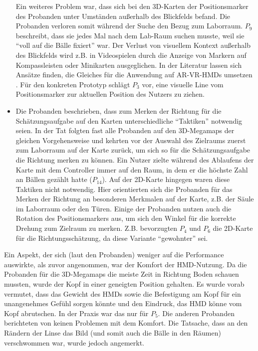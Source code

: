 \begin{itemize}
    Ein weiteres Problem war, dass sich bei den 3D-Karten der Positionsmarker des Probanden unter Umständen außerhalb des Blickfelds befand.
    Die Probanden verloren somit während der Suche den Bezug zum Laborraum.
    $P_9$ beschreibt, dass sie jedes Mal nach dem Lab-Raum suchen musste, weil sie \enquote{voll auf die Bälle fixiert} war.
    Der Verlust von visuellem Kontext außerhalb des Blickfelds wird z.B. in Videospielen durch die Anzeige von Markern auf Kompassleisten oder Minikarten ausgeglichen.
    In der Literatur lassen sich Ansätze finden, die Gleiches für die Anwendung auf AR-VR-HMDs umsetzen \autocites{Lin2017a}{Gruenefeld2017}.
    Für den konkreten Prototyp schlägt $P_3$ vor, eine visuelle Line vom Positionsmarker zur aktuellen Position des Nutzers zu ziehen.
    
    \item
    Die Probanden beschrieben, dass zum Merken der Richtung für die Schätzungsaufgabe auf den Karten unterschiedliche \enquote{Taktiken} notwendig seien.
    In der Tat folgten fast alle Probanden auf den 3D-Megamaps der gleichen Vorgehensweise und kehrten vor der Auswahl des Zielraums zuerst zum Laborraum auf der Karte zurück, um sich so für die Schätzungsaufgabe die Richtung merken zu können.
    Ein Nutzer zielte während des Ablaufens der Karte mit dem Controller immer auf den Raum, in dem er die höchste Zahl an Bällen gezählt hatte ($P_{14}$).
    Auf der 2D-Karte hingegen waren diese Taktiken nicht notwendig.
    Hier orientierten sich die Probanden für das Merken der Richtung an besonderen Merkmalen auf der Karte, z.B. der Säule im Laborraum oder den Türen.
    Einige der Probanden nutzen auch die Rotation des Positionsmarkers aus, um sich den Winkel für die korrekte Drehung zum Zielraum zu merken.
    Z.B. bevorzugten $P_4$ und $P_6$ die 2D-Karte für die Richtungsschätzung, da diese Variante \enquote{gewohnter} sei.
\end{itemize}

Ein Aspekt, der sich (laut den Probanden) weniger auf die Performance auswirkte, als zuvor angenommen, war der Komfort der HMD-Nutzung.
Da die Probanden für die 3D-Megamaps die meiste Zeit in Richtung Boden schauen mussten, wurde der Kopf in einer geneigten Position gehalten.
Es wurde vorab vermutet, dass das Gewicht des HMDs sowie die Befestigung am Kopf für ein unangenehmes Gefühl sorgen könnte und den Eindruck, das HMD könne vom Kopf abrutschen.
In der Praxis war das nur für $P_5$.
Die anderen Probanden berichteten von keinen Problemen mit dem Komfort.
Die Tatsache, dass an den Rändern der Linse das Bild (und somit auch die Bälle in den Räumen) verschwommen war, wurde jedoch angemerkt.

